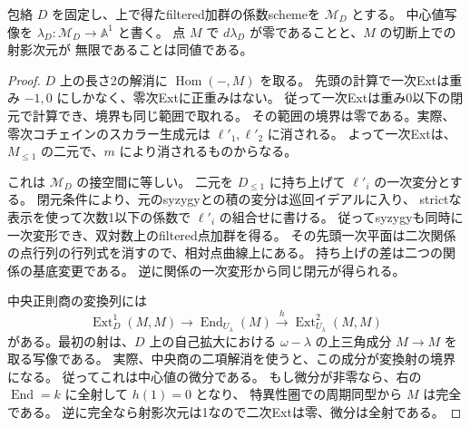 \begin{proposition}\label{prop:cubic-CY-three-alpha-elliptic-line-critical-value}
包絡 $D$ を固定し、上で得たfiltered加群の係数schemeを $\mathcal M_D$ とする。
中心値写像を $\lambda_D:\mathcal M_D\to\mathbb A^1$ と書く。
点 $M$ で $d\lambda_D$ が零であることと、$M$ の切断上での射影次元が
無限であることは同値である。
\end{proposition}
\begin{proof}
$D$ 上の長さ2の解消に $\operatorname{Hom}(-,M)$ を取る。
先頭の計算で一次Extは重み $-1,0$ にしかなく、零次Extに正重みはない。
従って一次Extは重み0以下の閉元で計算でき、境界も同じ範囲で取れる。
その範囲の境界は零である。実際、零次コチェインのスカラー生成元は
$\ell'_1,\ell'_2$ に消される。
よって一次Extは、$M_{\le1}$ の二元で、$m$ により消されるものからなる。

これは $\mathcal M_D$ の接空間に等しい。
二元を $D_{\le1}$ に持ち上げて $\ell'_i$ の一次変分とする。
閉元条件により、元のsyzygyとの積の変分は巡回イデアルに入り、
strictな表示を使って次数1以下の係数で $\ell'_i$ の組合せに書ける。
従ってsyzygyも同時に一次変形でき、双対数上のfiltered点加群を得る。
その先頭一次平面は二次関係の点行列の行列式を消すので、相対点曲線上にある。
持ち上げの差は二つの関係の基底変更である。
逆に関係の一次変形から同じ閉元が得られる。

中央正則商の変換列には
\[
 \operatorname{Ext}^1_D(M,M)\longrightarrow
 \operatorname{End}_{U_\lambda}(M)\xrightarrow{\,h\,}
 \operatorname{Ext}^2_{U_\lambda}(M,M)
\]
がある。最初の射は、$D$ 上の自己拡大における
$\omega-\lambda$ の上三角成分 $M\to M$ を取る写像である。
実際、中央商の二項解消を使うと、この成分が変換射の境界になる。
従ってこれは中心値の微分である。
もし微分が非零なら、右の $\operatorname{End}=k$ に全射して $h(1)=0$ となり、
特異性圏での周期同型から $M$ は完全である。
逆に完全なら射影次元は1なので二次Extは零、微分は全射である。
\end{proof}

